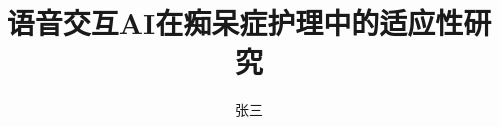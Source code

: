 \documentclass[master, eng, oneside]{hduthesis}
\title{语音交互AI在痴呆症护理中的适应性研究} %
\author{张三}
\institute{计算机学院}         %
\begin{document}
\maketitle

\abstractmatter



\tableofcontents %
 
%

\mainmatter





\backmatter





\makemyappendix
\end{document}
